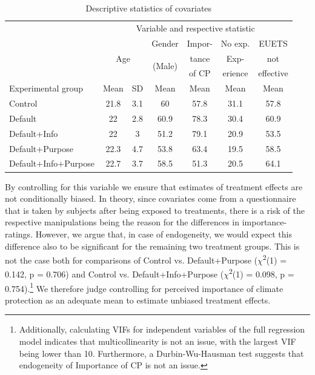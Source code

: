 \documentclass[review, authoryear,12pt]{elsarticle}
\begin{document}
\begin{table}[htbp]
  \centering
  \begin{adjustbox}{max width=\textwidth}
  \caption{Descriptive statistics of covariates}
    \label{tab3}%
    \begin{tabular}{lcccccc}
    \toprule
    \toprule
          & \multicolumn{6}{c}{Variable and respective statistic} \\
\cmidrule{2-7}          & \multicolumn{2}{c}{\multirow{3}[2]{*}{Age}} & Gender & Impor- & No exp. & EUETS \\
          & \multicolumn{2}{c}{} & \multirow{2}[1]{*}{(Male)} & tance & Exp-  & not \\
          & \multicolumn{2}{c}{} &       & of CP & erience & effective \\
\cmidrule{2-7}    Experimental group & Mean  & SD    & Mean    & Mean    & Mean    & Mean  \\
    \midrule
    Control & 21.8  & 3.1     & 60    & 57.8  & 31.1  & 57.8 \\
    Default & 22    & 2.8     & 60.9  & 78.3  & 30.4  & 60.9 \\
    Default+Info & 22    & 3     & 51.2  & 79.1  & 20.9  & 53.5 \\
    Default+Purpose & 22.3  & 4.7     & 53.8  & 63.4  & 19.5  & 58.5 \\
    Default+Info+Purpose & 22.7  & 3.7     & 58.5  & 51.3  & 20.5  & 64.1 \\
    \bottomrule
    \bottomrule
    \end{tabular}%
    \end{adjustbox}
\end{table}%


By controlling for this variable we ensure that estimates of treatment effects are not conditionally biased. In theory, since covariates come from a questionnaire that is taken by subjects after being exposed to treatments, there is a risk of the respective manipulations being the reason for the differences in importance-ratings. However, we argue that, in case of endogeneity, we would expect this difference also to be significant for the remaining two treatment groups. This is not the case both for comparisons of Control vs. Default+Purpose ($\chi$\textsuperscript{2}(1) = 0.142, p = 0.706) and Control vs. Default+Info+Purpose ($\chi$\textsuperscript{2}(1) = 0.098, p = 0.754).\footnote{Additionally, calculating VIFs for independent variables of the full regression model indicates that multicollinearity is not an issue, with the largest VIF being lower than 10. Furthermore, a Durbin-Wu-Hausman test suggests that endogeneity of Importance of CP is not an issue.} We therefore judge controlling for perceived importance of climate protection as an adequate mean to estimate unbiased treatment effects.
\end{document}
